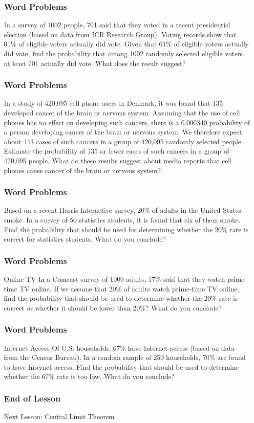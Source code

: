 \documentclass[xcolor=dvipsnames]{beamer}
\begin{document}
\begin{frame}
  \frametitle{Word Problems}
  {\ubung} In a survey of 1002 people, 701 said that they voted in a
  recent presidential election (based on data from ICR Research
  Group). Voting records show that 61\% of eligible voters actually
  did vote. Given that 61\% of eligible voters actually did vote, find
  the probability that among 1002 randomly selected eligible voters,
  at least 701 actually did vote. What does the result suggest?
\end{frame}

\begin{frame}
  \frametitle{Word Problems}
  {\ubung} In a study of 420,095 cell phone users in Denmark, it was
  found that 135 developed cancer of the brain or nervous system.
  Assuming that the use of cell phones has no effect on developing
  such cancers, there is a 0.000340 probability of a person developing
  cancer of the brain or nervous system. We therefore expect about 143
  cases of such cancers in a group of 420,095 randomly selected
  people. Estimate the probability of 135 or fewer cases of such
  cancers in a group of 420,095 people. What do these results suggest
  about media reports that cell phones cause cancer of the brain or
  nervous system?
\end{frame}

\begin{frame}
  \frametitle{Word Problems}
  {\ubung} Based on a recent Harris Interactive survey, 20\% of adults
  in the United States smoke. In a survey of 50 statistics students,
  it is found that six of them smoke. Find the probability that should
  be used for determining whether the 20\% rate is correct for
  statistics students. What do you conclude?
\end{frame}

\begin{frame}
  \frametitle{Word Problems}
  {\ubung} Online TV In a Comcast survey of 1000 adults, 17\% said
  that they watch prime-time TV online. If we assume that 20\% of
  adults watch prime-time TV online, find the probability that should
  be used to determine whether the 20\% rate is correct or whether it
  should be lower than 20\%? What do you conclude?
\end{frame}

\begin{frame}
  \frametitle{Word Problems}
  {\ubung} Internet Access Of U.S. households, 67\% have Internet
  access (based on data from the Census Bureau). In a random sample of
  250 households, 70\% are found to have Internet access. Find the
  probability that should be used to determine whether the 67\% rate
  is too low. What do you conclude?
\end{frame}

\begin{frame}
  \frametitle{End of Lesson}
Next Lesson: Central Limit Theorem
\end{frame}
\end{document}
